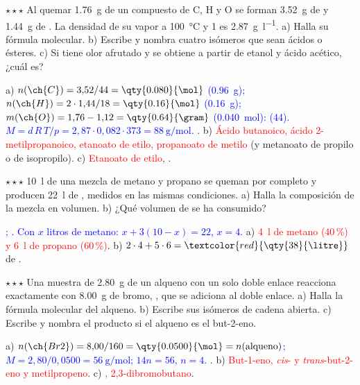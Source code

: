 \begin{exercise}
    \(\star\star\star\) Al quemar \qty{1.76}{\gram} de un compuesto de C, H y O se forman \qty{3.52}{\gram} de  y
    \qty{1.44}{\gram} de . La densidad de su vapor a \qty{100}{\degreeCelsius} y \qty{1}{\atm} es \qty{2.87}{\gram\per\litre}.
    a) Halla su fórmula molecular. b) Escribe y nombra cuatro isómeros que sean ácidos o ésteres. c) Si tiene olor afrutado y se
    obtiene a partir de etanol y ácido acético, ¿cuál es?
    \begin{solu}
        a) \textcolor{blue}{\(n(\ch{C}) = 3{,}52/44 = \qty{0.080}{\mol}\) (\qty{0.96}{\gram}); \(n(\ch{H}) = 2 \cdot 1{,}44/18 =
        \qty{0.16}{\mol}\) (\qty{0.16}{\gram}); \(m(\ch{O}) = 1{,}76 - 1{,}12 = \qty{0.64}{\gram}\) (\qty{0.040}{\mol}): 
        (44). \(M = d\,R\,T/p = 2{,}87 \cdot 0{,}082 \cdot 373 = \qty{88}{\gram\per\mol}\).} \textcolor{red}{}.
        b) \textcolor{red}{Ácido butanoico, ácido 2-metilpropanoico, etanoato de etilo, propanoato de metilo} (y metanoato de propilo
        o de isopropilo). c) \textcolor{red}{Etanoato de etilo}, .
    \end{solu}
\end{exercise}

\begin{exercise}
    \(\star\star\star\) \qty{10}{\litre} de una mezcla de metano y propano se queman por completo y producen \qty{22}{\litre} de
    , medidos en las mismas condiciones. a) Halla la composición de la mezcla en volumen. b) ¿Qué volumen de  se ha
    consumido?
    \begin{solu}
        \textcolor{blue}{; . Con \(x\) litros de metano:
        \(x + 3(10 - x) = 22\), \(x = 4\).} a) \textcolor{red}{\qty{4}{\litre} de metano (40\,\%) y \qty{6}{\litre} de propano (60\,\%)}.
        b) \(2 \cdot 4 + 5 \cdot 6 = \textcolor{red}{\qty{38}{\litre}}\) de .
    \end{solu}
\end{exercise}

\begin{exercise}
    \(\star\star\star\) Una muestra de \qty{2.80}{\gram} de un alqueno con un solo doble enlace reacciona exactamente con
    \qty{8.00}{\gram} de bromo, , que se adiciona al doble enlace. a) Halla la fórmula molecular del alqueno. b) Escribe
    sus isómeros de cadena abierta. c) Escribe y nombra el producto si el alqueno es el but-2-eno.
    \begin{solu}
        a) \textcolor{blue}{\(n(\ch{Br2}) = 8{,}00/160 = \qty{0.0500}{\mol} = n(\text{alqueno})\); \(M = 2{,}80/0{,}0500 =
        \qty{56}{\gram\per\mol}\); \(14n = 56\), \(n = 4\).} \textcolor{red}{}. b) \textcolor{red}{But-1-eno,
        \emph{cis}- y \emph{trans}-but-2-eno y metilpropeno}. c) \textcolor{red}{, 2,3-dibromobutano}.
    \end{solu}
\end{exercise}

